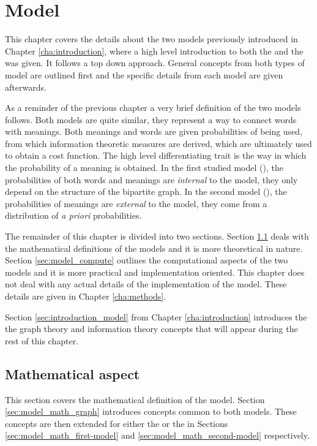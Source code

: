 \chapter{Model}
\label{cha:model}

This chapter covers the details about the two models previously introduced in Chapter \ref{cha:introduction}, where a high level introduction to both the \firstmodel{} and the \secondmodel{} was given.
It follows a top down approach.
General concepts from both types of model are outlined first and the specific details from each model are given afterwards.

As a reminder of the previous chapter a very brief definition of the two models follows.
Both models are quite similar, they represent a way to connect words with meanings.
Both meanings and words are given probabilities of being used, from which information theoretic measures are derived, which are ultimately used to obtain a cost function.
The high level differentiating trait is the way in which the probability of a meaning is obtained.
In the first studied model (\firstmodel{}), the probabilities of both words and meanings are \emph{internal} to the model, they only depend on the structure of the bipartite graph.
In the second model (\secondmodel{}), the probabilities of meanings are \emph{external} to the model, they come from a distribution of \emph{a priori} probabilities.

The remainder of this chapter is divided into two sections.
Section \ref{sec:model_math} deals with the mathematical definitions of the models and it is more theoretical in nature.
Section \ref{sec:model_compute} outlines the computational aspects of the two models and it is more practical and implementation oriented.
This chapter does not deal with any actual details of the implementation of the model.
These details are given in Chapter \ref{cha:methods}.

Section \ref{sec:introduction_model} from Chapter \ref{cha:introduction} introduces the  the graph theory and information theory concepts that will appear during the rest of this chapter.

\section{Mathematical aspect}
\label{sec:model_math}

This section covers the mathematical definition of the model.
Section \ref{sec:model_math_graph} introduces concepts common to both models.
These concepts are then extended for either the \firstmodel{} or the \secondmodel{} in Sections \ref{sec:model_math_first-model} and \ref{sec:model_math_second-model} respectively.

